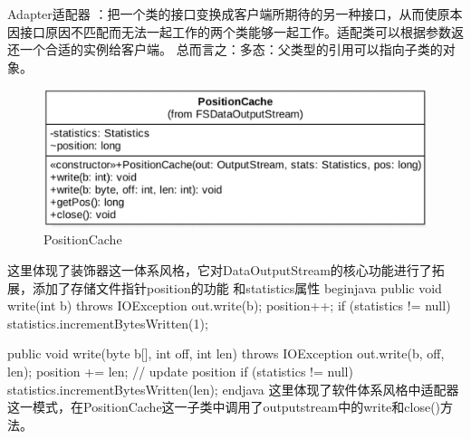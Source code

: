 Adapter适配器 ：把一个类的接口变换成客户端所期待的另一种接口，从而使原本因接口原因不匹配而无法一起工作的两个类能够一起工作。适配类可以根据参数返还一个合适的实例给客户端。
总而言之：多态：父类型的引用可以指向子类的对象。
\begin{figure}[h]
\centering
\includegraphics[width =1\linewidth]{positioncache.png}
\caption{PositionCache}
\label{fig:PositionCache}
\end{figure}
这里体现了装饰器这一体系风格，它对DataOutputStream的核心功能进行了拓展，添加了存储文件指针position的功能
和statistics属性
begin{java}
public void write(int b) throws IOException {
  out.write(b);
  position++;
  if (statistics != null) {
    statistics.incrementBytesWritten(1);
  }
}

public void write(byte b[], int off, int len) throws IOException {
  out.write(b, off, len);
  position += len;                            // update position
  if (statistics != null) {
    statistics.incrementBytesWritten(len);
  }
}
end{java}
这里体现了软件体系风格中适配器这一模式，在PositionCache这一子类中调用了outputstream中的write和close()方法。


\endinput
